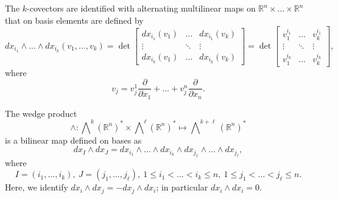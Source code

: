 \documentclass[intlimits,12pt,reqno]{amsart}
\newcommand{\R}{\mathbb R}
\numberwithin{equation}{section}
\theoremstyle{definition}
\newcommand{\Ep}{\bigwedge\nolimits}
\begin{document}
The $k$-covectors are identified with alternating multilinear maps on $\R^n\times\ldots\times\R^n$ that on basis elements are defined by
$$
dx_{i_1}\wedge\ldots\wedge dx_{i_k}(v_1,\ldots,v_k)=
\det
\left [\begin{array}{ccc}
dx_{i_1}(v_1) & \ldots & dx_{i_1}(v_k)\\
\vdots & \ddots & \vdots\\
dx_{i_k}(v_1) & \ldots & dx_{i_k}(v_k)
\end{array} \right]=
\det
\left [\begin{array}{ccc}
v_1^{{i_1}} & \ldots & v_k^{{i_1}}\\
\vdots & \ddots & \vdots\\
v_1^{i_k} & \ldots & v_k^{{i_k}}
\end{array} \right],
$$
where
$$
v_j=v^{1}_j\frac{\partial}{\partial x_1}+\ldots+v^{n}_j\frac{\partial}{\partial x_n}.
$$

The wedge product
$$
\wedge: \Ep^k (\mathbb{R}^n)^\ast \times \Ep^\ell (\mathbb{R}^n)^\ast \mapsto \Ep^{k+\ell} (\mathbb{R}^n)^\ast
$$ 
is  a bilinear map defined on bases as
$$
dx_I \wedge dx_J = dx_{i_1} \wedge \ldots \wedge dx_{i_k} \wedge dx_{j_1} \wedge \ldots \wedge dx_{j_\ell},
$$
where
$$
I=(i_1,\ldots,i_k),\ J=(j_1,\ldots,j_\ell),\ 1\leq i_1<\ldots<i_k\leq n,\ 
1\leq j_1<\ldots<j_\ell\leq n.
$$
Here, we identify $dx_i \wedge dx_j = -dx_j\wedge dx_i$; in particular $dx_i \wedge dx_i = 0$.
\end{document}
